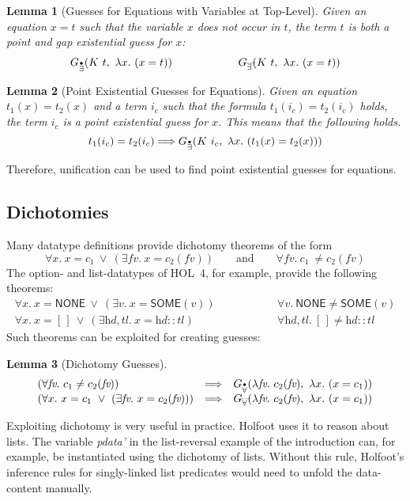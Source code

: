 \documentclass[a4paper,12pt,DIV=12,oneside]{scrbook}
\newcommand{\fv}{\textit{fv}}
\newtheorem{lemma}{Lemma}[section]
\theoremstyle{definition}
\theoremstyle{remark}
\newcommand{\GEP}{\ensuremath{G_{\accentset{\bullet}{\exists}}}}
\newcommand{\GEG}{\ensuremath{G_{\accentset{\_\,\_}{\exists}}}}
\newcommand{\GUP}{\ensuremath{G_{\accentset{\bullet}{\forall}}}}
\newcommand{\GUG}{\ensuremath{G_{\accentset{\_\,\_}{\forall}}}}
\begin{document}
\begin{lemma}[Guesses for Equations with Variables at Top-Level]\label{lemma_guesses_equation_top}
Given an equation $x = t$ such that the variable $x$
does not occur in $t$, the term $t$ is both a point and gap existential guess for
$x$:
\[%
\begin{array}{ccc}
\GEP(K\ t,\ \lambda x.\ (x = t)) & \qquad\qquad & \GEG(K\ t,\ \lambda x.\ (x = t)) \\
\end{array}
\]
\end{lemma}
%
\begin{lemma}[Point Existential Guesses for Equations]\label{lemma_guesses_equation_T}
Given an equation $t_1(x) = t_2(x)$ and a term $i_c$ such that
the formula $t_1(i_c) = t_2(i_c)$ holds, the term $i_c$ is a point existential guess for
$x$. This means that the following holds.
\[
t_1(i_c) = t_2(i_c) \Longrightarrow
\GEP(K\ i_c,\ \lambda x.\ (t_1(x) = t_2(x)))
\]
\end{lemma}
\noindent
Therefore, unification can be used to find point existential guesses for equations.


\subsection{Dichotomies}\label{subsec_base_guesses_dichotomies}
Many datatype definitions provide dichotomy theorems of the form
\[
  \forall x.\ x = c_1\ \vee\ (\exists \fv.\ x = c_2(\fv)) \qquad \text{and} \qquad
  \forall \fv.\ c_1\ \neq c_2(\fv)
\]
The option- and list-datatypes of HOL~4, for example, provide the following theorems:
\[
\begin{array}{ccc}
  \forall x.\ x = \textsf{NONE}\ \vee\ (\exists v.\ x = \textsf{SOME}(v)) & \qquad \qquad &
  \forall v.\ \textsf{NONE} \neq \textsf{SOME}(v) \\

  \forall x.\ x = [\,]\ \vee\ (\exists \textit{hd}, \textit{tl}.\ x = \textit{hd}::\textit{tl}) & &
  \forall \textit{hd}, \textit{tl}.\ [\,] \neq \textit{hd}::\textit{tl}
\end{array}
\]
%
Such theorems can be exploited for creating guesses:
\begin{lemma}[Dichotomy Guesses]\label{lemma_guesses_dichotomy}
\[
\begin{array}{l@{\quad}l@{\quad}l}
(\forall \fv.\ c_1 \neq c_2(\fv)) & \Longrightarrow &
\GUP(\lambda \fv.\ c_2(\fv),\ \lambda x.\ (x = c_1)) \\

(\forall x.\ x = c_1\ \vee\ (\exists \fv.\ x = c_2(\fv))) & \Longrightarrow &
\GUG(\lambda \fv.\ c_2(\fv),\ \lambda x.\ (x = c_1))
\end{array}
\]
\end{lemma}
%
Exploiting dichotomy is very useful in practice. Holfoot uses it to reason about lists.
The variable \textit{pdata'} in the list-reversal example of the introduction can, for example,
be instantiated using the dichotomy of lists. Without this rule, Holfoot's inference rules for
singly-linked list predicates would need to unfold the data-content manually.
\end{document}
